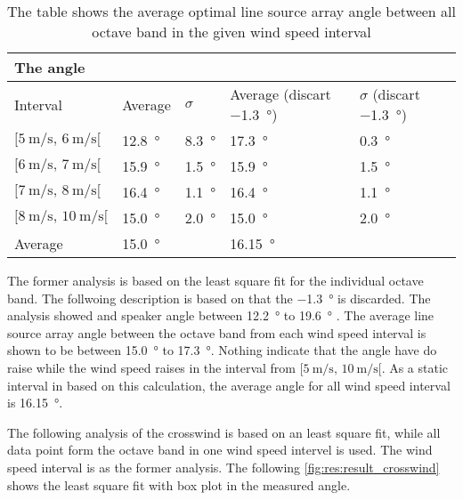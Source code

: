   \begin{table}[H]
 \centering
  \caption{The table shows the average optimal line source array angle between all octave band  in the given wind speed interval}
\begin{tabular}{l|l|l|l|l}
\multicolumn{2}{l}{The angle}      \\ \hline
Interval & Average  & $\sigma$ & Average (discart  \SI{-1.3}{\degree}) & $\sigma$ (discart  \SI{-1.3}{\degree}) \\ \hline
  $[\SI{5}{\meter\per\second},\, \SI{6}{\meter\per\second}[ $       &   \SI{12.8}{\degree}  &   \SI{8.3}{\degree}  &   \SI{17.3}{\degree}   &   \SI{0.3}{\degree}\\
    $[\SI{6}{\meter\per\second},\, \SI{7}{\meter\per\second}[ $     &   \SI{15.9}{\degree}   &   \SI{1.5}{\degree} &   \SI{15.9}{\degree}   &   \SI{1.5}{\degree}\\
  $[\SI{7}{\meter\per\second},\, \SI{8}{\meter\per\second}[ $       &    \SI{16.4}{\degree}  &   \SI{1.1}{\degree} &    \SI{16.4}{\degree}&    \SI{1.1}{\degree}  \\
   $[\SI{8}{\meter\per\second},\, \SI{10}{\meter\per\second}[ $      &     \SI{15.0}{\degree}  &   \SI{2.0}{\degree} &     \SI{15.0}{\degree} &     \SI{2.0}{\degree} \\ \hline
    Average      &     \SI{15.0}{\degree} &  &\SI{16.15}{\degree}&
\end{tabular}
\label{res:tab:cross_mean}
\end{table}  
 
The former analysis is based on the least square fit for the individual octave band. The follwoing description is based on that the \SI{-1.3}{\degree} is discarded. The analysis showed and speaker angle between  \SI{12.2}{\degree} to  \SI{19.6}{\degree} . The average line source array angle between the octave band from each wind speed interval is shown to be between \SI{15.0}{\degree} to \SI{17.3}{\degree}. Nothing indicate that the angle have do raise while the wind speed raises in the interval from $[\SI{5}{\meter\per\second},\, \SI{10}{\meter\per\second}[ $. As a static interval in based on this calculation, the average angle for all wind speed interval is \SI{16.15}{\degree}.

The following analysis of the crosswind is based on an least square fit, while all data point form the octave band in one wind speed intervel is used. The wind speed interval is as the former analysis. The following \autoref{fig:res:result_crosswind} shows the least square fit with box plot in the measured angle. 
 
